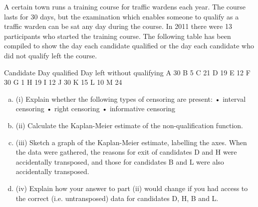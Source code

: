 \documentclass[a4paper,12pt]{article}
\begin{document}
\large
\noindent A certain town runs a training course for traffic wardens each year. The course lasts for 30 days, but the examination which enables someone to qualify as a traffic warden can be sat any day during the course. In 2011 there were 13 participants who started
the training course. The following table has been compiled to show the day each candidate qualified or the day each candidate who did not qualify left the course.

Candidate Day qualified Day left without
qualifying
A 30
B 5
C 21
D 19
E 12
F 30
G 1
H 19
I 12
J 30
K 15
L 10
M 24
\begin{enumerate}[(a)]
\item (i) Explain whether the following types of censoring are present:
• interval censoring
• right censoring
• informative censoring
\item 
(ii) Calculate the Kaplan-Meier estimate of the non-qualification function. 

\item (iii) Sketch a graph of the Kaplan-Meier estimate, labelling the axes. 
When the data were gathered, the reasons for exit of candidates D and H were accidentally transposed, and those for candidates B and L were also accidentally transposed.
\item (iv) Explain how your answer to part (ii) would change if you had access to the correct (i.e. untransposed) data for candidates D, H, B and L.
\end{enumerate}
\end{document}
